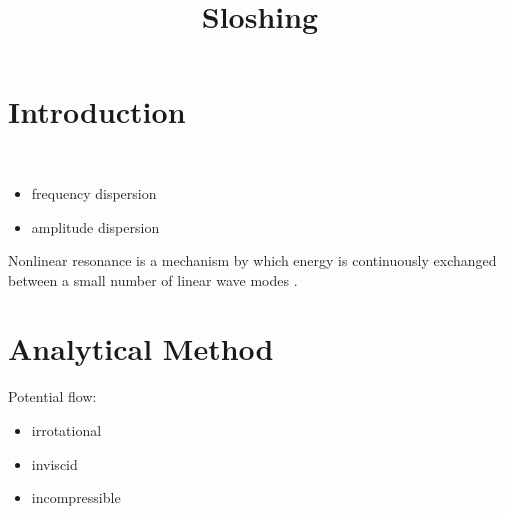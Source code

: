 \documentclass{blog}
\title{Sloshing}
\begin{document}
\maketitle
\tableofcontents

\section{Introduction}
\begin{definition}[dispersion]~
    \begin{itemize}
        \item frequency dispersion
        \item amplitude dispersion
    \end{itemize}
\end{definition}

\begin{definition}
    Nonlinear resonance is a mechanism by which energy is continuously exchanged between a small number of linear wave modes \cite{DUREY_2023_RESONANT_TRIAD_INTERACTIONS_OF_GRAVITY_WAVES_IN_CYLINDRICAL_BASINS}.
\end{definition}

\section{Analytical Method}
\begin{definition}
    Potential flow:
    \begin{itemize}
        \item irrotational
        \item inviscid
        \item incompressible
    \end{itemize}
\end{definition}
\end{document}
